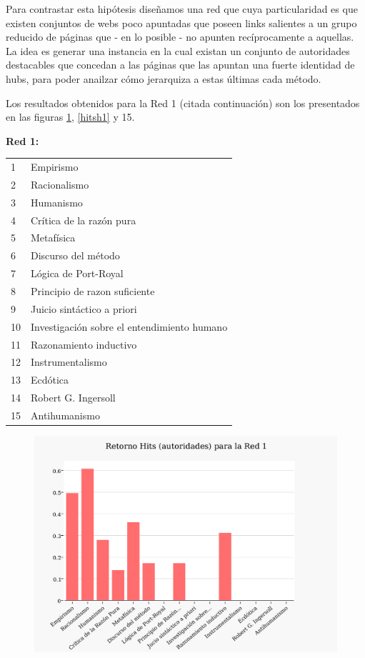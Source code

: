\documentclass[a4paper]{article}
\begin{document}
Para contrastar esta hipótesis diseñamos una red que cuya particularidad es que existen conjuntos de webs poco apuntadas que poseen links salientes a un grupo reducido de páginas que - en lo posible - no apunten recíprocamente a aquellas. La idea es generar una instancia en la cual existan un conjunto de autoridades destacables  que concedan a las páginas que las apuntan una fuerte identidad de hubs, para poder anailzar cómo jerarquiza a estas últimas cada método.

Los resultados obtenidos para la Red 1  (citada continuación) son los presentados en las figuras \ref{hitsa1}, \ref{hitsh1} y 15.

\textbf{Red 1:}\\

\begin{tabular}{l l}
1 & Empirismo \\
2 & Racionalismo \\
3 & Humanismo \\
4 & Crítica de la razón pura \\
5 & Metafísica \\
6 & Discurso del método \\
7 & Lógica de Port-Royal \\
8 & Principio de razon suficiente \\
9 & Juicio sintáctico a priori \\
10 & Investigación sobre el entendimiento humano \\
11 & Razonamiento inductivo \\
12 & Instrumentalismo \\
13 & Ecdótica \\
14 & Robert G. Ingersoll \\
15 & Antihumanismo \\
\end{tabular}

\newpage
\begin{figure}[h!]
  \begin{center}
	\includegraphics[scale=0.66]{imagenes/Exp1/hitsA1}
	\caption{}	
	\label{hitsa1}
  \end{center}
\end{figure}
\end{document}
